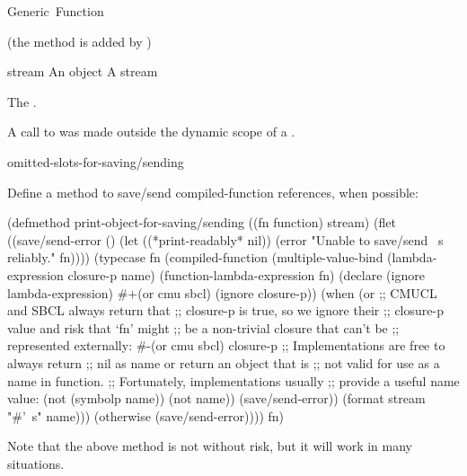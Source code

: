 \documentclass[10pt,twoside,english,pdftex]{article}
\begin{document}
\begin{functiondoc}{Generic~Function}
\fnpackage {}

\fnmodule {} (the  method is added by
)

\fnargs
\begin{args}{stream}
\arg[object] An object
\arg[stream] A stream
\end{args}

\fnreturns The .

\fnerrors
%
A call to  was made outside the
dynamic scope of a .

\begin{alsos}{omitted-slots-for-saving/sending}
\end{alsos}

\fnexample Define a method to save/send compiled-function references,
when possible:
%
\W\supp
\begin{example}
  (defmethod print-object-for-saving/sending ((fn function)
                                              stream)
    (flet ((save/send-error ()
             (let ((*print-readably* nil))
               (error "Unable to save/send ~s reliably." fn))))
      (typecase fn
        (compiled-function
         (multiple-value-bind (lambda-expression closure-p name)
             (function-lambda-expression fn)
           (declare (ignore lambda-expression)
                    #+(or cmu sbcl)
                    (ignore closure-p))
           (when (or 
                  ;; CMUCL and SBCL always return that
                  ;; closure-p is true, so we ignore their
                  ;; closure-p value and risk that `fn' might
                  ;; be a non-trivial closure that can't be
                  ;; represented externally:
                  #-(or cmu sbcl)
                  closure-p
                  ;; Implementations are free to always return
                  ;; nil as name or return an object that is
                  ;; not valid for use as a name in function.
                  ;; Fortunately, implementations usually
                  ;; provide a useful name value:
                  (not (symbolp name))
                  (not name))
             (save/send-error))
           (format stream "#'~s" name)))
        (otherwise (save/send-error))))
    fn)
\end{example}
Note that the above method is not without risk, but it will work in
many situations.
\end{functiondoc}
\end{document}
